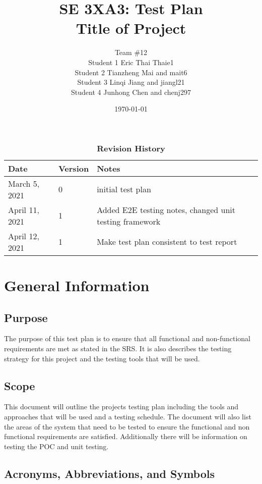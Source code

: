 \documentclass[12pt, titlepage]{article}
\title{SE 3XA3: Test Plan\\Title of Project}
\author{Team \#12
		\\ Student 1 Eric Thai Thaie1
		\\ Student 2 Tianzheng Mai and mait6
		\\ Student 3 Linqi Jiang and jiangl21
		\\ Student 4 Junhong Chen and chenj297
}
\date{\today}
\begin{document}
\maketitle

\tableofcontents
\listoftables

\begin{table}[bp]
\caption{\bf Revision History}
\begin{tabularx}{\textwidth}{p{3cm}p{2cm}X}
\toprule {\bf Date} & {\bf Version} & {\bf Notes}\\
\midrule
March 5, 2021 & 0 & initial test plan\\
April 11, 2021 & 1 & Added E2E testing notes, changed unit testing framework\\
April 12, 2021 & 1 & Make test plan consistent to test report\\
\bottomrule
\end{tabularx}
\end{table}

\newpage


\section{General Information}

\subsection{Purpose}
The purpose of this test plan is to ensure that all functional and non-functional requirements are met as stated in the SRS. It is also describes the testing strategy for this project and the testing tools that will be used.

\subsection{Scope}
This document will outline the projects testing plan including the tools and approaches that will be used and a testing schedule. The document will also list the areas of the system that need to be tested to ensure the functional and non functional requirements are satisfied. Additionally there will be information on testing the POC and unit testing.
\subsection{Acronyms, Abbreviations, and Symbols}
	
\end{document}
